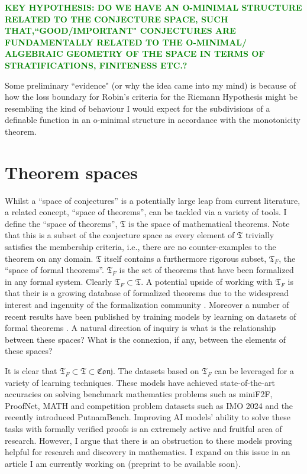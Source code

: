 \textcolor{green}{\textbf{KEY HYPOTHESIS: DO WE HAVE AN O-MINIMAL STRUCTURE RELATED TO THE CONJECTURE SPACE, SUCH THAT,``GOOD/IMPORTANT" CONJECTURES 
ARE FUNDAMENTALLY RELATED TO THE O-MINIMAL/ ALGEBRAIC GEOMETRY OF THE SPACE IN TERMS OF STRATIFICATIONS, FINITENESS ETC.?}
}

Some preliminary ``evidence" (or why the idea came into my mind) is because of how the loss boundary for Robin's criteria for the Riemann Hypothesis might be resembling the kind of behaviour I would expect for the subdivisions of a definable function in an o-minimal structure in accordance with the monotonicity theorem.

\section{Theorem spaces}
Whilst a ``space of conjectures'' is a potentially large leap from current literature, a related concept, ``space of theorems'', can be tackled via a variety of tools.
I define the ``space of theorems'', $\mathfrak{T}$ is the space of mathematical theorems. Note that this is a subset of the conjecture space as every element of $\mathfrak{T}$ trivially satisfies the membership criteria, i.e.,
there are no counter-examples to the theorem on any domain.
$\mathfrak{T}$ itself contains a furthermore rigorous subset, $\mathfrak{T}_F$, the ``space of formal theorems''. $\mathfrak{T}_F$ is the set of theorems that have been formalized in any formal system. Clearly $\mathfrak{T}_F\subset\mathfrak{T}$. A potential upside of working with $\mathfrak{T}_F$ is that their is a growing database of formalized theorems due to the widespread interest and ingenuity of the formalization community \cite{formalization_examples}.
Moreover a number of recent results have been published by training models by learning on datasets of formal theorems \cite{Deepmind_stuff}. A natural direction of inquiry is what is the relationship between these spaces? What is the connexion, if any, between the elements of these spaces?
\\\par
It is clear that $\mathfrak{T}_F\subset\mathfrak{T}\subset\mathfrak{Conj}$. The datasets based on $\mathfrak{T}_F$ can be leveraged for a variety of learning techniques. These models have achieved state-of-the-art accuracies on solving benchmark mathematics problems such as miniF2F, ProofNet, MATH and competition problem datasets such as IMO 2024 and the recently introduced PutnamBench. Improving AI models' ability to solve these tasks with formally verified proofs
is an extremely active and fruitful area of research. However, I argue that there is an obstruction to these models proving helpful for research and discovery in mathematics. I expand on this issue in an article I am currently working on (preprint to be available soon). 

